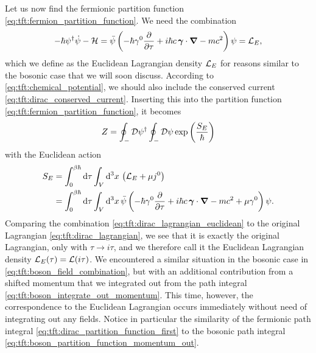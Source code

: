 Let us now find the fermionic partition function \eqref{eq:tft:fermion_partition_function}.
We need the combination
\begin{equation}
	-\hbar \psi^\dagger \dot\psi - \mathcal{H} =
	\bar\psi \left( -\hbar \gamma^0 \pdv{}{\tau} + i \hbar c \, {\bm{\gamma}} \cdot {\bm{\nabla}} - mc^2 \right) \psi =
	\mathcal{L}_E ,
\label{eq:tft:dirac_lagrangian_euclidean}
\end{equation}
which we define as the Euclidean Lagrangian density $\mathcal{L}_E$ for reasons similar to the bosonic case that we will soon discuss.
According to \cref{eq:tft:chemical_potential}, we should also include the conserved current \eqref{eq:tft:dirac_conserved_current}.
Inserting this into the partition function \eqref{eq:tft:fermion_partition_function}, it becomes
\begin{equation}
	Z = \oint_- \mathcal{D} \psi^\dagger \oint_- \mathcal{D} \psi
	    \exp \left( \frac{S_E}{\hbar} \right)
\label{eq:tft:dirac_partition_function_first}
\end{equation}
with the Euclidean action
\begin{equation}
\begin{split}
	S_E &= \int_0^{\beta \hbar} \mathop{}\!\mathrm{d} \tau \int_V \mathop{}\!\mathrm{d}^3 x \, \left( \mathcal{L}_E + \mu j^0 \right) \\
	    &= \int_0^{\beta \hbar} \mathop{}\!\mathrm{d} \tau \int_V \mathop{}\!\mathrm{d}^3 x \, \bar\psi \left( -\hbar \gamma^0 \pdv{}{\tau} + i \hbar c \, {\bm{\gamma}} \cdot {\bm{\nabla}} - mc^2 + \mu \gamma^0 \right) \psi .
\end{split}
\label{eq:tft:dirac_action_euclidean}
\end{equation}
Comparing the combination \eqref{eq:tft:dirac_lagrangian_euclidean} to the original Lagrangian \eqref{eq:tft:dirac_lagrangian}, we see that it is exactly the original Lagrangian, only with $\tau \rightarrow i \tau$, and we therefore call it the Euclidean Lagrangian density $\mathcal{L}_E(\tau) = \mathcal{L}(i \tau)$.
We encountered a similar situation in the bosonic case in \cref{eq:tft:boson_field_combination}, but with an additional contribution from a shifted momentum that we integrated out from the path integral \eqref{eq:tft:boson_integrate_out_momentum}.
This time, however, the correspondence to the Euclidean Lagrangian occurs immediately without need of integrating out any fields.
Notice in particular the similarity of the fermionic path integral \eqref{eq:tft:dirac_partition_function_first} to the bosonic path integral \eqref{eq:tft:boson_partition_function_momentum_out}.

